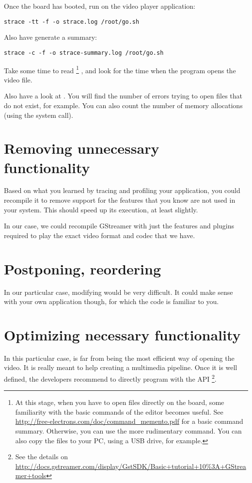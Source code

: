 Once the board has booted, run  on the video player
application:

\begin{verbatim}
strace -tt -f -o strace.log /root/go.sh
\end{verbatim}

Also have  generate a summary:

\begin{verbatim}
strace -c -f -o strace-summary.log /root/go.sh
\end{verbatim}

Take some time to read 
\footnote{At this stage, when you have to open files directly on the
board, some familiarity with the basic commands of the  editor
becomes useful. See
\url{http://free-electrons.com/doc/command_memento.pdf} for a basic
command summary. Otherwise, you can use the more rudimentary 
command. You can also copy the files to your PC, using a USB drive, for
example.}
, and look for the time when the program opens the video file.

Also have a look at . You will find the number
of errors trying to open files that do not exist, for example. You can
also count the number of memory allocations (using the  system call).

\section{Removing unnecessary functionality}

Based on what you learned by tracing and profiling your application, you
could recompile it to remove support for the features that you know are
not used in your system. This should speed up its execution, at least
slightly.

In our case, we could recompile GStreamer with just the features
and plugins required to play the exact video format and codec that we
have.

\section{Postponing, reordering}

In our particular case, modifying  would be very
difficult. It could make sense with your own application though, for
which the code is familiar to you.

\section{Optimizing necessary functionality}

In this particular case,  is far from being the most
efficient way of opening the video. It is really meant to help creating
a multimedia pipeline. Once it is well defined, the 
developers recommend to directly program with the  API
\footnote{See the details on
\url{http://docs.gstreamer.com/display/GstSDK/Basic+tutorial+10\%3A+GStreamer+tools}}.
